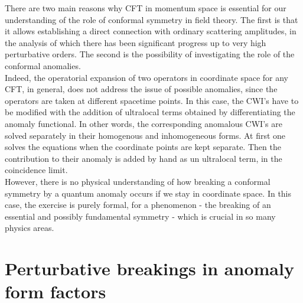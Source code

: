\documentclass[a4paper,11pt,openright,twoside]{book}
\numberwithin{equation}{section}
\begin{document}
There are two main reasons why CFT in momentum space is essential for our understanding of the role of conformal symmetry in field theory. The first is that it allows establishing a direct connection with ordinary scattering amplitudes, in the analysis of which there has been significant progress up to very high perturbative orders. 
The second is the possibility of investigating the role of the conformal anomalies.  \\
Indeed, the operatorial expansion of two operators in coordinate space for any CFT, in general, does not address the issue of possible anomalies, since the operators are taken at different spacetime points. In this case, the CWI's have to be modified with the addition of ultralocal terms obtained by differentiating the anomaly functional. In other words, the corresponding anomalous CWI's are solved separately in their homogenous and inhomogeneous forms. At first one solves the equations when the coordinate points are kept separate. Then the contribution to their anomaly is added by hand as un ultralocal term, in the coincidence limit.\\
However, there is no physical understanding of how breaking a conformal symmetry by a quantum anomaly occurs if we stay in coordinate space. In this case, the exercise is purely formal, for a phenomenon - the breaking of an essential and possibly fundamental symmetry - which is crucial in so many physics areas.\\

\section*{Perturbative breakings in anomaly form factors}
\end{document}
